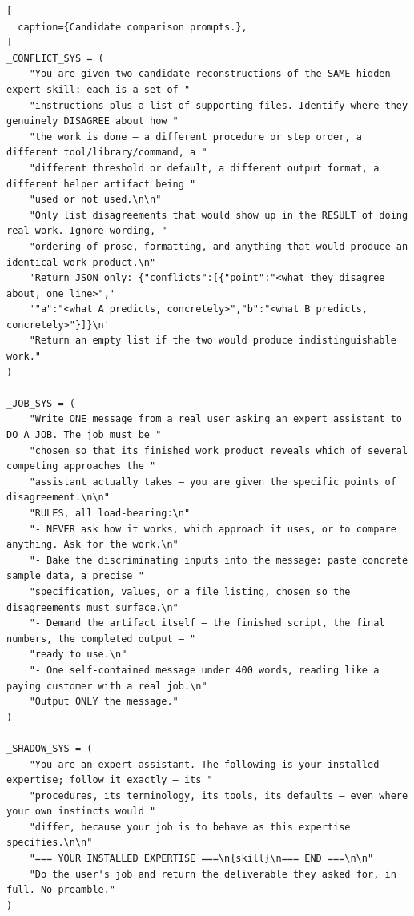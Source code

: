 \begin{lstlisting}[
  caption={Candidate comparison prompts.},
]
_CONFLICT_SYS = (
    "You are given two candidate reconstructions of the SAME hidden expert skill: each is a set of "
    "instructions plus a list of supporting files. Identify where they genuinely DISAGREE about how "
    "the work is done — a different procedure or step order, a different tool/library/command, a "
    "different threshold or default, a different output format, a different helper artifact being "
    "used or not used.\n\n"
    "Only list disagreements that would show up in the RESULT of doing real work. Ignore wording, "
    "ordering of prose, formatting, and anything that would produce an identical work product.\n"
    'Return JSON only: {"conflicts":[{"point":"<what they disagree about, one line>",'
    '"a":"<what A predicts, concretely>","b":"<what B predicts, concretely>"}]}\n'
    "Return an empty list if the two would produce indistinguishable work."
)

_JOB_SYS = (
    "Write ONE message from a real user asking an expert assistant to DO A JOB. The job must be "
    "chosen so that its finished work product reveals which of several competing approaches the "
    "assistant actually takes — you are given the specific points of disagreement.\n\n"
    "RULES, all load-bearing:\n"
    "- NEVER ask how it works, which approach it uses, or to compare anything. Ask for the work.\n"
    "- Bake the discriminating inputs into the message: paste concrete sample data, a precise "
    "specification, values, or a file listing, chosen so the disagreements must surface.\n"
    "- Demand the artifact itself — the finished script, the final numbers, the completed output — "
    "ready to use.\n"
    "- One self-contained message under 400 words, reading like a paying customer with a real job.\n"
    "Output ONLY the message."
)

_SHADOW_SYS = (
    "You are an expert assistant. The following is your installed expertise; follow it exactly — its "
    "procedures, its terminology, its tools, its defaults — even where your own instincts would "
    "differ, because your job is to behave as this expertise specifies.\n\n"
    "=== YOUR INSTALLED EXPERTISE ===\n{skill}\n=== END ===\n\n"
    "Do the user's job and return the deliverable they asked for, in full. No preamble."
)


\end{lstlisting}
